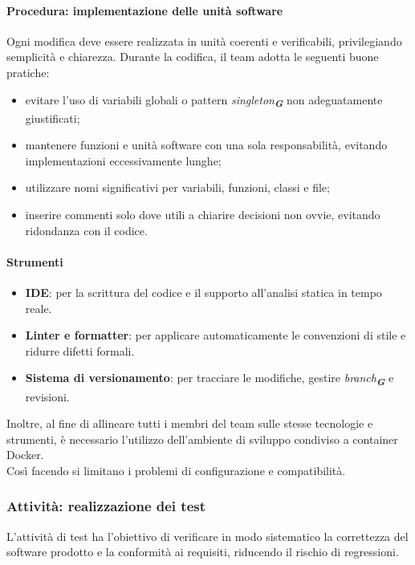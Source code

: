 \documentclass[a4paper,12pt]{article}
\newcommand{\glossario}[1]{\textit{#1}\textsubscript{\textbf{\textit{\textcolor{lightblack}{G}}}}}
\begin{document}
\paragraph{Procedura: implementazione delle unità software}
Ogni modifica deve essere realizzata in unità coerenti e verificabili,
privilegiando semplicità e chiarezza. Durante la codifica, il team adotta le
seguenti buone pratiche:
\begin{itemize}
        \item evitare l'uso di variabili globali o pattern \textit{\glossario{singleton}} non adeguatamente giustificati;
        \item mantenere funzioni e unità software con una sola responsabilità, evitando implementazioni eccessivamente lunghe;
        \item utilizzare nomi significativi per variabili, funzioni, classi e file;
        \item inserire commenti solo dove utili a chiarire decisioni non ovvie, evitando ridondanza con il codice.
\end{itemize}

\paragraph{Strumenti}
\begin{itemize}
        \item \textbf{IDE}: per la scrittura del codice e il supporto all'analisi statica in tempo reale.
        \item \textbf{Linter e formatter}: per applicare automaticamente le convenzioni di stile e ridurre difetti formali.
        \item \textbf{Sistema di versionamento}: per tracciare le modifiche, gestire \glossario{branch} e revisioni.
\end{itemize}
Inoltre, al fine di allineare tutti i membri del team sulle stesse tecnologie e strumenti, è necessario l'utilizzo dell'ambiente di sviluppo condiviso a container Docker. \\
Così facendo si limitano i problemi di configurazione e compatibilità.
\subsubsection{Attività: realizzazione dei test}
L'attività di test ha l'obiettivo di verificare in modo sistematico la
correttezza del software prodotto e la conformità ai requisiti, riducendo il
rischio di regressioni.
\end{document}
